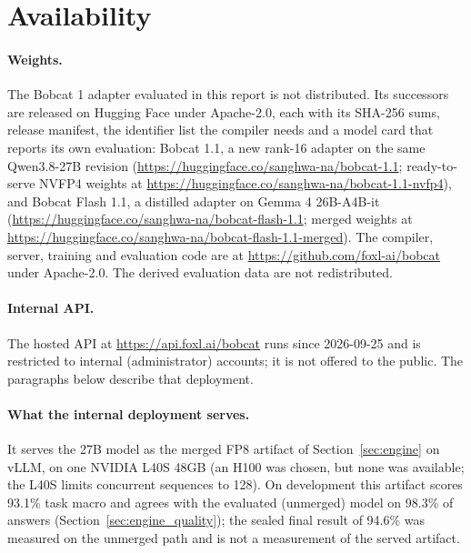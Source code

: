\section{Availability}
\label{sec:availability}

\paragraph{Weights.}
The Bobcat 1 adapter evaluated in this report is not distributed. Its successors are released
on Hugging Face under Apache-2.0, each with its SHA-256 sums, release manifest, the identifier
list the compiler needs and a model card that reports its own evaluation: Bobcat 1.1, a new
rank-16 adapter on the same Qwen3.8-27B revision
(\url{https://huggingface.co/sanghwa-na/bobcat-1.1}; ready-to-serve NVFP4 weights at
\url{https://huggingface.co/sanghwa-na/bobcat-1.1-nvfp4}), and Bobcat Flash 1.1, a distilled
adapter on Gemma 4 26B-A4B-it (\url{https://huggingface.co/sanghwa-na/bobcat-flash-1.1};
merged weights at \url{https://huggingface.co/sanghwa-na/bobcat-flash-1.1-merged}). The
compiler, server, training and evaluation code are at \url{https://github.com/foxl-ai/bobcat}
under Apache-2.0. The derived evaluation data are not redistributed.

\paragraph{Internal API.}
The hosted API at \url{https://api.foxl.ai/bobcat} runs since 2026-09-25 and is restricted
to internal (administrator) accounts; it is not offered to the public. The paragraphs below
describe that deployment.

\paragraph{What the internal deployment serves.}
It serves the 27B model as the merged FP8 artifact of Section~\ref{sec:engine} on vLLM, on
one NVIDIA L40S 48GB (an H100 was chosen, but none was available; the L40S limits concurrent
sequences to 128). On development this artifact scores 93.1\%
task macro and agrees with the evaluated (unmerged) model on 98.3\% of answers
(Section~\ref{sec:engine_quality}); the sealed final result of 94.6\% was measured on the
unmerged path and is not a measurement of the served artifact.

